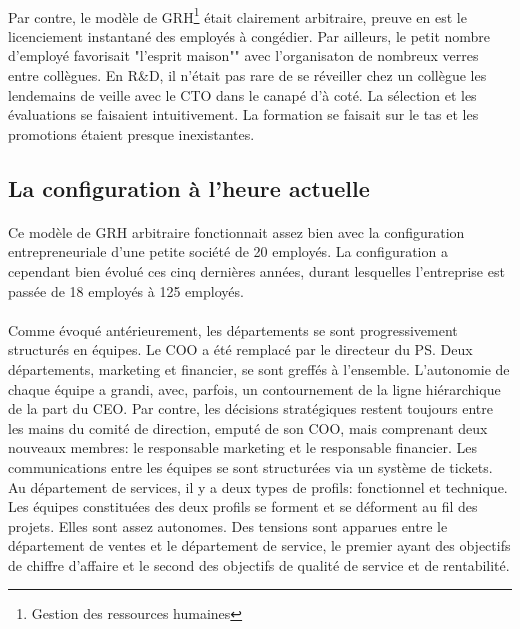 \paragraph{}Par contre, le modèle de GRH\footnote{Gestion des ressources humaines} était clairement arbitraire\citep[pp. 115-119]{pichault}, preuve en est le licenciement instantané des employés à congédier. Par ailleurs, le petit nombre d'employé favorisait "l'esprit maison"" avec l'organisaton de nombreux verres entre collègues. En R\&D, il n'était pas rare de se réveiller chez un collègue les lendemains de veille avec le CTO dans le canapé d'à coté. La sélection et les évaluations se faisaient intuitivement.  La formation se faisait sur le tas et les promotions étaient presque inexistantes. 

\subsection{La configuration à l'heure actuelle}
\paragraph{} Ce modèle de GRH arbitraire fonctionnait assez bien avec la configuration entrepreneuriale d'une petite société de 20 employés. La configuration a cependant bien évolué ces cinq dernières années, durant lesquelles l'entreprise est passée de 18 employés à 125 employés. 

\paragraph{} Comme évoqué antérieurement, les départements se sont progressivement structurés en équipes. Le COO a été remplacé par le directeur du PS. Deux départements, marketing et financier, se sont greffés à l'ensemble. L'autonomie de chaque équipe a grandi, avec, parfois, un contournement de la ligne hiérarchique de la part du CEO. Par contre, les décisions stratégiques restent toujours entre les mains du comité de direction, emputé de son COO, mais comprenant deux nouveaux membres: le responsable marketing et le responsable financier. Les communications entre les équipes se sont structurées via un système de tickets. Au département de services, il y a deux types de profils: fonctionnel et technique. Les équipes constituées des deux profils se forment et se déforment au fil des projets. Elles sont assez autonomes. Des tensions sont apparues entre le département de ventes et le département de service, le premier ayant des objectifs de chiffre d'affaire et le second des objectifs de qualité de service et de rentabilité.

